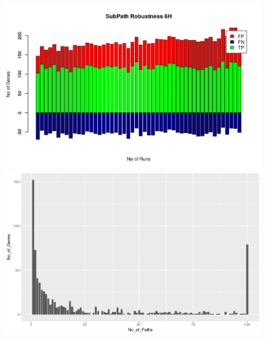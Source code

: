 \documentclass[twocolumn]{article}
\begin{document}
\begin{figure}[p]
	\centering
	\includegraphics[width=14cm]{"SubPath Robustness 6H"}
\caption{}
\label{fig:subpath-robustness-6h}
\includegraphics[width=14cm]{Betweeness}
\caption{}
\label{fig:betweeness}
\end{figure}
\end{document}
